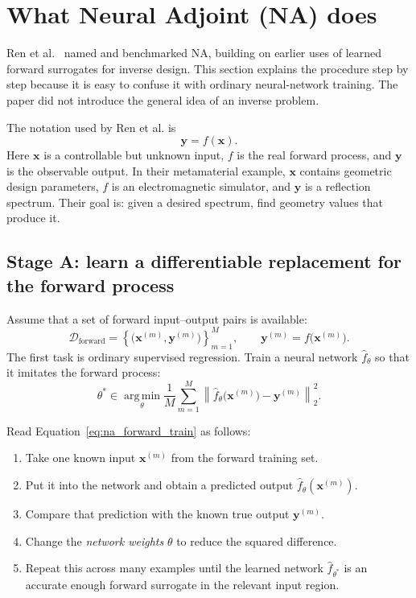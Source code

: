 \documentclass[11pt]{article}
\newcommand{\vect}[1]{\mathbf{#1}}
\begin{document}
\section{What Neural Adjoint (NA) does}

Ren et al.~\cite{ren2020} named and benchmarked NA, building on earlier uses of learned forward surrogates for inverse design. This section explains the procedure step by step because it is easy to confuse it with ordinary neural-network training. The paper did not introduce the general idea of an inverse problem.

The notation used by Ren et al. is
\begin{equation}
    \vect{y}=f(\vect{x}).
    \label{eq:na_paper_forward}
\end{equation}
Here $\vect{x}$ is a controllable but unknown input, $f$ is the real forward process, and $\vect{y}$ is the observable output. In their metamaterial example, $\vect{x}$ contains geometric design parameters, $f$ is an electromagnetic simulator, and $\vect{y}$ is a reflection spectrum. Their goal is: given a desired spectrum, find geometry values that produce it.

\subsection{Stage A: learn a differentiable replacement for the forward process}

Assume that a set of forward input--output pairs is available:
\begin{equation}
    \mathcal{D}_{\mathrm{forward}}=
    \left\{\bigl(\vect{x}^{(m)},\vect{y}^{(m)}\bigr)\right\}_{m=1}^{M},
    \qquad
    \vect{y}^{(m)}=f\bigl(\vect{x}^{(m)}\bigr).
    \label{eq:na_forward_data}
\end{equation}
The first task is ordinary supervised regression. Train a neural network $\hat f_{\theta}$ so that it imitates the forward process:
\begin{equation}
    \theta^\ast\in
    \operatorname*{arg\,min}_{\theta}
    \frac{1}{M}\sum_{m=1}^{M}
    \left\|
    \hat f_{\theta}\bigl(\vect{x}^{(m)}\bigr)-
    \vect{y}^{(m)}
    \right\|_2^2.
    \label{eq:na_forward_train}
\end{equation}

Read Equation~\eqref{eq:na_forward_train} as follows:
\begin{enumerate}
    \item Take one known input $\vect{x}^{(m)}$ from the forward training set.
    \item Put it into the network and obtain a predicted output $\hat f_{\theta}(\vect{x}^{(m)})$.
    \item Compare that prediction with the known true output $\vect{y}^{(m)}$.
    \item Change the \emph{network weights} $\theta$ to reduce the squared difference.
    \item Repeat this across many examples until the learned network $\hat f_{\theta^\ast}$ is an accurate enough forward surrogate in the relevant input region.
\end{enumerate}
\end{document}
